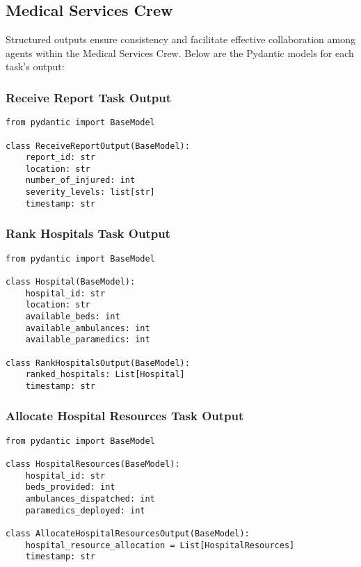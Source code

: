 \subsection{Medical Services Crew}

Structured outputs ensure consistency and facilitate effective collaboration among agents within the Medical Services Crew. Below are the Pydantic models for each task's output:

\subsubsection{Receive Report Task Output}
\begin{lstlisting}[caption={Pydantic model for Receive Report Task Output}]
from pydantic import BaseModel

class ReceiveReportOutput(BaseModel):
    report_id: str
    location: str
    number_of_injured: int
    severity_levels: list[str]
    timestamp: str
\end{lstlisting}

\subsubsection{Rank Hospitals Task Output}
\begin{lstlisting}[caption={Pydantic model for Rank Hospitals Task Output}]
from pydantic import BaseModel

class Hospital(BaseModel):
    hospital_id: str
    location: str
    available_beds: int
    available_ambulances: int
    available_paramedics: int

class RankHospitalsOutput(BaseModel):
    ranked_hospitals: List[Hospital]
    timestamp: str
\end{lstlisting}

\subsubsection{Allocate Hospital Resources Task Output}
\begin{lstlisting}[caption={Pydantic model for Allocate Hospital Resources Task Output}]
from pydantic import BaseModel

class HospitalResources(BaseModel):
    hospital_id: str
    beds_provided: int
    ambulances_dispatched: int
    paramedics_deployed: int

class AllocateHospitalResourcesOutput(BaseModel):
    hospital_resource_allocation = List[HospitalResources]
    timestamp: str
\end{lstlisting}

